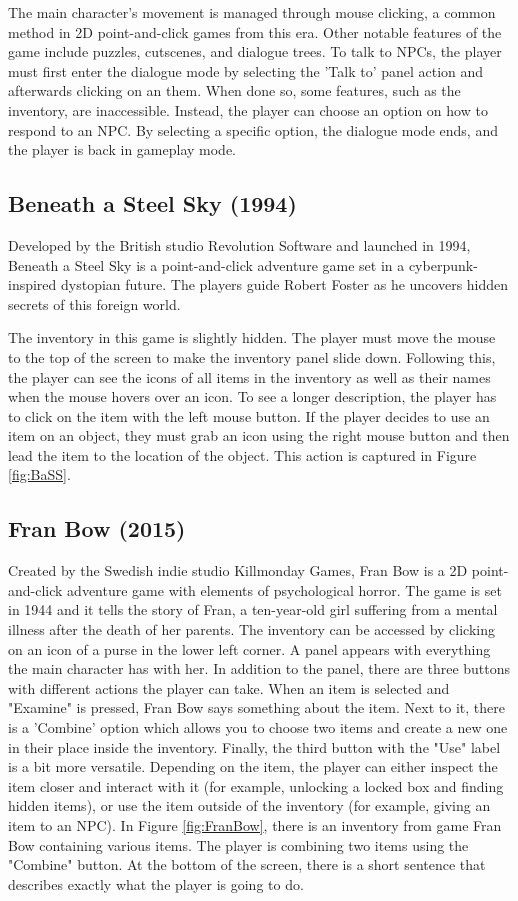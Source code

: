 The main character's movement is managed through mouse clicking, a common method in 2D point-and-click games from this era. Other notable features of the game include puzzles, cutscenes, and dialogue trees. To talk to NPCs, the player must first enter the dialogue mode by selecting the 'Talk to' panel action and afterwards clicking on an them. When done so, some features, such as the inventory, are inaccessible. Instead, the player can choose an option on how to respond to an NPC. By selecting a specific option, the dialogue mode ends, and the player is back in gameplay mode.

\subsection{Beneath a Steel Sky (1994)}
Developed by the British studio Revolution Software and launched in 1994, Beneath a Steel Sky is a point-and-click adventure game set in a cyberpunk-inspired dystopian future. The players guide Robert Foster as he uncovers hidden secrets of this foreign world.



The inventory in this game is slightly hidden. The player must move the mouse to the top of the screen to make the inventory panel slide down. Following this, the player can see the icons of all items in the inventory as well as their names when the mouse hovers over an icon. To see a longer description, the player has to click on the item with the left mouse button. If the player decides to use an item on an object, they must grab an icon using the right mouse button and then lead the item to the location of the object. This action is captured in Figure \ref{fig:BaSS}.


\subsection{Fran Bow (2015)}
Created by the Swedish indie studio Killmonday Games, Fran Bow is a 2D point-and-click adventure game with elements of psychological horror. The game is set in 1944 and it tells the story of Fran, a ten-year-old girl suffering from a mental illness after the death of her parents.
The inventory can be accessed by clicking on an icon of a purse in the lower left corner. A panel appears with everything the main character has with her. In addition to the panel, there are three buttons with different actions the player can take. When an item is selected and "Examine" is pressed, Fran Bow says something about the item. Next to it, there is a 'Combine' option which allows you to choose two items and create a new one in their place inside the inventory. Finally, the third button with the "Use" label is a bit more versatile. Depending on the item, the player can either inspect the item closer and interact with it (for example, unlocking a locked box and finding hidden items), or use the item outside of the inventory (for example, giving an item to an NPC).
In Figure \ref{fig:FranBow}, there is an inventory from game Fran Bow containing various items. The player is combining two items using the "Combine" button. At the bottom of the screen, there is a short sentence that describes exactly what the player is going to do.

